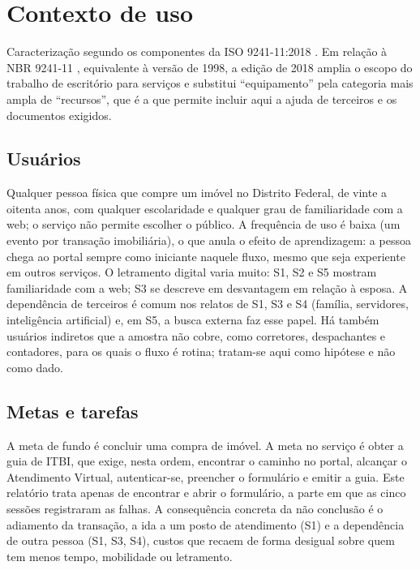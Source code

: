 \documentclass[
  12pt,
  oneside,
  a4paper,
  chapter=TITLE,
  section=TITLE,
  english,
  brazilian
]{abntex2}
\begin{document}
\chapter{Contexto de uso}\label{cap:contexto}

Caracterização segundo os componentes da ISO 9241-11:2018
\cite{iso9241-11-2018}. Em relação à NBR 9241-11 \cite{nbr9241-11}, equivalente à
versão de 1998, a edição de 2018 amplia o escopo do trabalho de escritório para
serviços e substitui ``equipamento'' pela categoria mais ampla de ``recursos'',
que é a que permite incluir aqui a ajuda de terceiros e os documentos exigidos.

\section{Usuários}

Qualquer pessoa física que compre um imóvel no Distrito Federal, de vinte a
oitenta anos, com qualquer escolaridade e qualquer grau de familiaridade com a
web; o serviço não permite escolher o público. A frequência de uso é baixa (um
evento por transação imobiliária), o que anula o efeito de aprendizagem: a
pessoa chega ao portal sempre como iniciante naquele fluxo, mesmo que seja
experiente em outros serviços. O letramento digital varia muito: S1, S2 e S5 mostram familiaridade com a web; S3 se descreve em desvantagem em relação à esposa. A dependência de terceiros é comum nos relatos de S1, S3 e S4 (família, servidores, inteligência artificial) e, em S5, a busca externa faz esse papel. Há também usuários indiretos que a amostra não cobre,
como corretores, despachantes e contadores, para os quais o fluxo é rotina;
tratam-se aqui como hipótese e não como dado.

\section{Metas e tarefas}

A meta de fundo é concluir uma compra de imóvel. A meta no serviço é obter a
guia de ITBI, que exige, nesta ordem, encontrar o caminho no portal, alcançar o
Atendimento Virtual, autenticar-se, preencher o formulário e emitir a guia.
Este relatório trata apenas de encontrar e abrir o formulário, a parte
em que as cinco sessões registraram as falhas. A consequência concreta da não
conclusão é o adiamento da transação, a ida a um posto de atendimento (S1) e a
dependência de outra pessoa (S1, S3, S4), custos que recaem de forma desigual
sobre quem tem menos tempo, mobilidade ou letramento.
\end{document}

